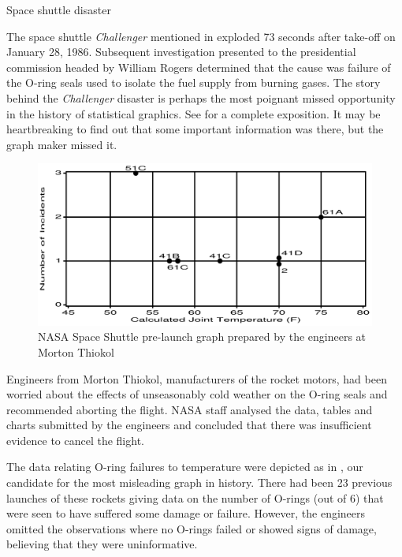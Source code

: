 \documentclass[11pt]{book}
\begin{document}
\begin{Example}[nasa]{Space shuttle disaster}

The space shuttle \emph{Challenger} mentioned in 
exploded 73 seconds after take-off on
January 28, 1986.
Subsequent investigation presented to the presidential commission
headed by William Rogers
determined that the cause was failure of the O-ring
seals used to isolate the fuel supply from burning gases.
The story behind the \emph{Challenger} disaster is perhaps the most poignant
missed opportunity in the history of statistical graphics.
See \citet{Tufte:97} for a complete exposition.
It may be heartbreaking to find out that some important information
was there, but the graph maker missed it.

\begin{figure}[htb]
  \centering
  \includegraphics[width=\textwidth,clip]{ch01/fig/nasa0}
  \caption{NASA Space Shuttle pre-launch graph prepared by the engineers at Morton Thiokol}\label{fig:nasa0}
\end{figure}

Engineers from Morton Thiokol, manufacturers of the rocket motors,
had been worried about the effects of unseasonably cold weather
on the O-ring seals and recommended aborting the flight.
NASA staff analysed the data, tables and charts submitted by
the engineers and concluded that there was insufficient evidence
to cancel the flight.

The data relating O-ring failures to temperature were depicted as in
, our candidate for the most misleading graph in history.
There had been 23 previous launches of these rockets giving data on
the number of O-rings (out of 6) that were seen to have suffered
some damage or failure. However, the engineers omitted the observations
where no O-rings failed or showed signs of damage, believing that they were uninformative.


\end{Example}
\end{document}
